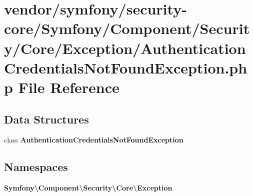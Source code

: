 \section{vendor/symfony/security-\/core/\+Symfony/\+Component/\+Security/\+Core/\+Exception/\+Authentication\+Credentials\+Not\+Found\+Exception.php File Reference}
\label{_authentication_credentials_not_found_exception_8php}
\subsection*{Data Structures}
\begin{DoxyCompactItemize}
\item 
class {\bf Authentication\+Credentials\+Not\+Found\+Exception}
\end{DoxyCompactItemize}
\subsection*{Namespaces}
\begin{DoxyCompactItemize}
\item 
 {\bf Symfony\textbackslash{}\+Component\textbackslash{}\+Security\textbackslash{}\+Core\textbackslash{}\+Exception}
\end{DoxyCompactItemize}
